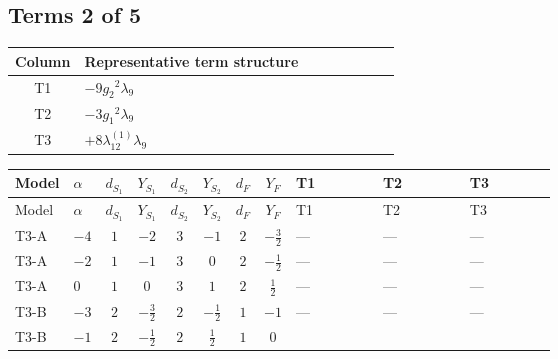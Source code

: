 \documentclass[8pt]{article}
\begin{document}
\begin{landscape}
\subsection*{Terms 2 of 5}
\begin{center}
\begin{tabular}{@{}c >{\raggedright\arraybackslash}p{0.82\linewidth}@{}}
\toprule
Column & Representative term structure \\
\midrule
T1 & \(\displaystyle -9 {g_2}^2 {\lambda_{9}}\) \\
\midrule
T2 & \(\displaystyle -3 {g_1}^2 {\lambda_{9}}\) \\
\midrule
T3 & \(\displaystyle +8 {\lambda_{12}^{(1)}} {\lambda_{9}}\) \\
\midrule
\bottomrule
\end{tabular}
\end{center}
\smallskip
\tiny
\begin{longtable}{@{}llcccccc >{\raggedright\arraybackslash}p{0.21\linewidth} >{\raggedright\arraybackslash}p{0.21\linewidth} >{\raggedright\arraybackslash}p{0.21\linewidth}@{}}
\toprule
Model & $\alpha$ & $d_{S_1}$ & $Y_{S_1}$ & $d_{S_2}$ & $Y_{S_2}$ & $d_F$ & $Y_F$ & T1 & T2 & T3 \\
\midrule
\endfirsthead
\toprule
Model & $\alpha$ & $d_{S_1}$ & $Y_{S_1}$ & $d_{S_2}$ & $Y_{S_2}$ & $d_F$ & $Y_F$ & T1 & T2 & T3 \\
\midrule
\endhead
T3-A & $-4$ & $1$ & $-2$ & $3$ & $-1$ & $2$ & $-\frac{3}{2}$ & --- & --- & --- \\
\midrule
T3-A & $-2$ & $1$ & $-1$ & $3$ & $0$ & $2$ & $-\frac{1}{2}$ & --- & --- & --- \\
\midrule
T3-A & $0$ & $1$ & $0$ & $3$ & $1$ & $2$ & $\frac{1}{2}$ & --- & --- & --- \\
\midrule
T3-B & $-3$ & $2$ & $-\frac{3}{2}$ & $2$ & $-\frac{1}{2}$ & $1$ & $-1$ & --- & --- & --- \\
\midrule
T3-B & $-1$ & $2$ & $-\frac{1}{2}$ & $2$ & $\frac{1}{2}$ & $1$ & $0$ & \scriptsize\adjustbox{max width=\linewidth}{$\begin{gathered} -9 {g_2}^2 {\lambda_{9}}\end{gathered}$} & \scriptsize\adjustbox{max width=\linewidth}{$\begin{gathered} -3 {g_1}^2 {\lambda_{9}}\end{gathered}$} & \scriptsize\adjustbox{max width=\linewidth}{$\begin{gathered} +8 {\lambda_{12}^{(1)}} {\lambda_{9}}\end{gathered}$} \\

\end{longtable}
\end{landscape}
\end{document}
